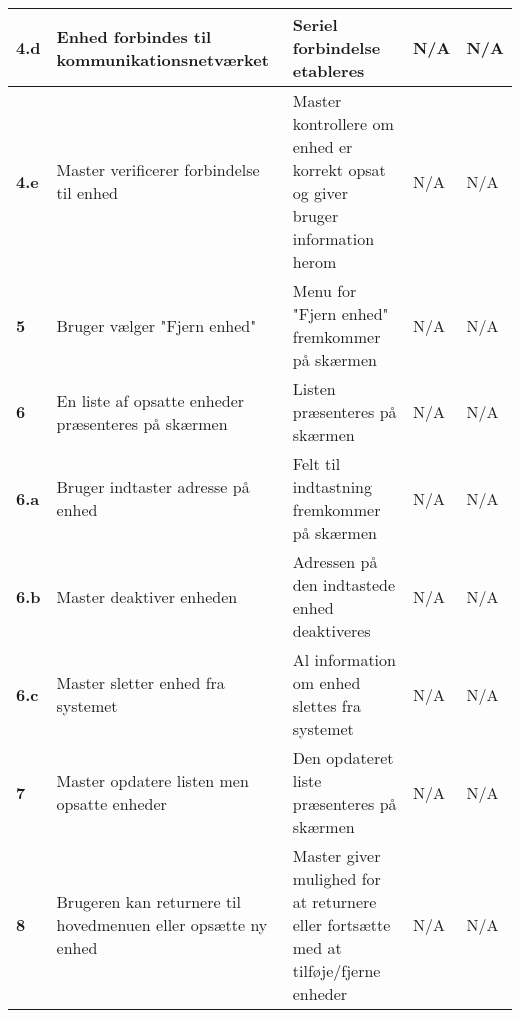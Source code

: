 \begin{center}
\begin{longtable}{|p{}|p{}|p{}|p{}|p{}|}
\textbf{4.d}&Enhed forbindes til kommunikationsnetværket 
			&Seriel forbindelse etableres 
			&N/A
			&N/A \\\hline  
			
\textbf{4.e}&Master verificerer forbindelse til enhed 
			&Master kontrollere om enhed er korrekt opsat og giver bruger information herom 
			&N/A 
			&N/A \\\hline 
			
\textbf{5}	&Bruger vælger "Fjern enhed" 
			&Menu for "Fjern enhed" fremkommer på skærmen 
			&N/A 
			&N/A \\\hline
			 
\textbf{6}	&En liste af opsatte enheder præsenteres på skærmen 
			&Listen præsenteres på skærmen 
			&N/A 
			&N/A \\\hline
			 
\textbf{6.a}&Bruger indtaster adresse på enhed 
			&Felt til indtastning fremkommer på skærmen 
			&N/A 
			&N/A \\\hline
			 
\textbf{6.b}&Master deaktiver enheden 
			&Adressen på den indtastede enhed deaktiveres
			&N/A 
			&N/A \\\hline
			
\textbf{6.c}&Master sletter enhed fra systemet 
			&Al information om enhed slettes fra systemet 
			&N/A 
			&N/A \\\hline
			 
\textbf{7}	&Master opdatere listen men opsatte enheder 
			&Den opdateret liste præsenteres på skærmen 
			&N/A 
			&N/A \\\hline
			 
\textbf{8}	&Brugeren kan returnere til hovedmenuen eller opsætte ny enhed 
			&Master giver mulighed for at returnere eller fortsætte med at tilføje/fjerne enheder 
			&N/A
			&N/A \\\hline

\end{longtable}
	\label{ATUC1} 
\end{center}